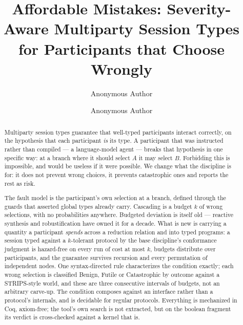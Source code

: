 \documentclass[a4paper,UKenglish,cleveref,autoref,thm-restate,anonymous]{lipics-v2021}
\title{Affordable Mistakes: Severity-Aware Multiparty Session Types for
Participants that Choose Wrongly}
\author{Anonymous Author}{Anonymous Affiliation, Anonymous City, Anonymous Country}{anon@anon.org}{}{}
\author{Anonymous Author}{Anonymous Affiliation, Anonymous City, Anonymous Country}{anon@anon.org}{}{}
\newcommand{\Ben}{\textsf{Benign}}
\newcommand{\Fut}{\textsf{Futile}}
\newcommand{\Cat}{\textsf{Catastrophic}}
\begin{document}
\maketitle

\begin{abstract}
Multiparty session types guarantee that well-typed participants interact correctly, on the
hypothesis that each participant \emph{is} its type. A participant that was instructed rather
than compiled --- a language-model agent --- breaks that hypothesis in one specific way: at a
branch where it should select $A$ it may select $B$. Forbidding this is impossible, and would
be useless if it were possible. We change what the discipline is for: it does not prevent wrong
choices, it prevents catastrophic ones and reports the rest as risk.

The fault model is the participant's own selection at a branch, defined through the guards that
asserted global types already carry. Cascading is a budget $k$ of wrong selections, with no
probabilities anywhere. Budgeted deviation is itself old --- reactive synthesis and
robustification have owned it for a decade. What is new is carrying a quantity a participant
\emph{spends} across a reduction relation and into typed programs: a session typed against a
$k$-tolerant protocol by the base discipline's conformance judgment is hazard-free on every run
of cost at most $k$, budgets distribute over participants, and the guarantee survives recursion
and every permutation of independent nodes. One syntax-directed rule characterizes the condition
exactly; each wrong selection is classified \Ben, \Fut{} or \Cat{} by outcome against a
STRIPS-style world, and these are three consecutive intervals of budgets, not an arbitrary
carve-up. The condition composes against an interface rather than a protocol's internals, and is
decidable for regular protocols. Everything is mechanized in Coq, axiom-free; the tool's own
search is not extracted, but on the boolean fragment its verdict is cross-checked against a
kernel that is.


\end{abstract}
\end{document}
